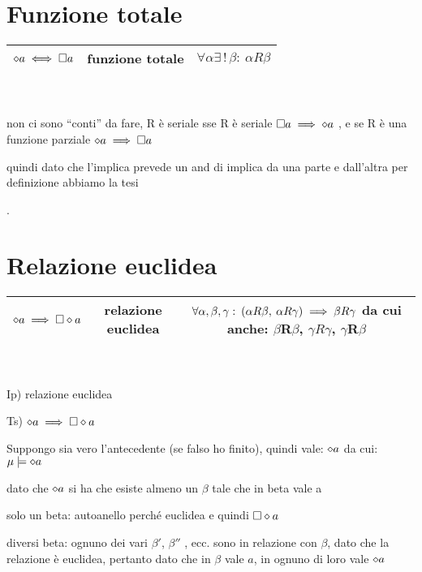 \section{Funzione totale}

\begin{tabular}{|c|c|c|}
\hline 
$\diamond a\iff\square a$  & funzione totale  & $\forall\alpha\exists\,!\,\beta:\:\alpha R\beta$ \tabularnewline
\hline 
\end{tabular}\\
 \\


non ci sono ``conti'' da fare, R è seriale sse R è seriale $\square a\implies\diamond a$
, e se R è una funzione parziale $\diamond a\implies\square a$

quindi dato che l'implica prevede un and di implica da una parte e
dall'altra per definizione abbiamo la tesi

.


\section{Relazione euclidea}

\begin{tabular}{|c|c|c|}
\hline 
$\diamond a\implies\square\diamond a$  & relazione euclidea  & $\forall\alpha,\beta,\gamma:\:(\alpha R\beta,\:\alpha R\gamma)\implies\beta R\gamma$
da cui anche: $\beta$R$\beta$, $\gamma R\gamma$, $\gamma$R$\beta$\tabularnewline
\hline 
\end{tabular}\\
 \\


Ip) relazione euclidea

Ts) $\diamond a\implies\square\diamond a$

Suppongo sia vero l'antecedente (se falso ho finito), quindi vale:
$\diamond a$ da cui: $\mu\models\diamond a$

dato che $\diamond a$ si ha che esiste almeno un $\beta$ tale che in beta
vale a

solo un beta: autoanello perché euclidea e quindi $\square\diamond a$

diversi beta: ognuno dei vari $\beta'$, $\beta''$ , ecc. sono in
relazione con $\beta$, dato che la relazione è euclidea, pertanto
dato che in $\beta$ vale $a$, in ognuno di loro vale $\diamond a$ \\


